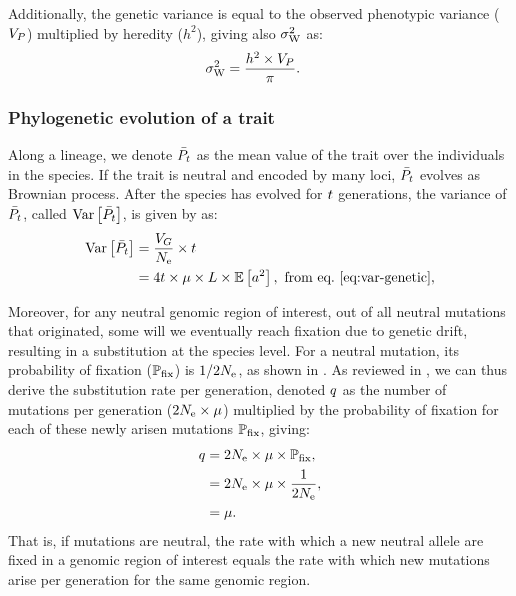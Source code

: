 \documentclass{article}
\begin{document}
Additionally, the genetic variance is equal to the observed phenotypic variance ($V_{P}$) multiplied by heredity ($h^2$), giving also $\sigma^2_{\text{W}}$ as:
\begin{align}
    \sigma^2_{\text{W}} & = \frac{h^2 \times V_{P} }{\pi }. \label{eq:rate-pheno-pop}
\end{align}

\subsubsection{Phylogenetic evolution of a trait}

Along a lineage, we denote $\bar{P_{t}}$ as the mean value of the trait over the individuals in the species.
If the trait is neutral and encoded by many loci, $\bar{P_{t}}$ evolves as Brownian process\cite{hansen_translating_1996}.
After the species has evolved for $t$ generations, the variance of $\bar{P_{t}}$, called $\operatorname{\text{Var}} \left[\bar{P_{t}}\right]$, is given by \textcite{hansen_translating_1996} as:
\begin{align}
    \operatorname{\text{Var}} \left[\bar{P_{t}}\right] & = \frac{V_{G}}{N_{\text{e}}} \times t \\
    & = 4 t \times \mu \times L \times \operatorname{\mathbb{E}} \left[ a^2 \right] \label{eq:covar},\text{ from eq.~\ref{eq:var-genetic}},
\end{align}

Moreover, for any neutral genomic region of interest, out of all neutral mutations that originated, some will we eventually reach fixation due to genetic drift, resulting in a substitution at the species level.
For a neutral mutation, its probability of fixation ($\mathbb{P}_{\text{fix}}$) is $1/2N_{\text{e}}$, as shown in \textcite{kimura_probability_1962}.
As reviewed in \textcite{mccandlish_modeling_2014}, we can thus derive the substitution rate per generation, denoted $q$ as the number of mutations per generation ($2N_{\text{e}} \times \mu$) multiplied by the probability of fixation for each of these newly arisen mutations $\mathbb{P}_{\text{fix}}$, giving:
\begin{align}
    q & = 2 N_{\text{e}} \times \mu \times \mathbb{P}_{\text{fix}}, \\
    & = 2 N_{\text{e}}  \times \mu  \times \dfrac{1}{2N_{\text{e}}}, \\
    & = \mu. \label{eq:substitution-rate}
\end{align}
That is, if mutations are neutral, the rate with which a new neutral allele are fixed in a genomic region of interest equals the rate with which new mutations arise per generation for the same genomic region\cite{kimura_evolutionary_1968}.
\end{document}
